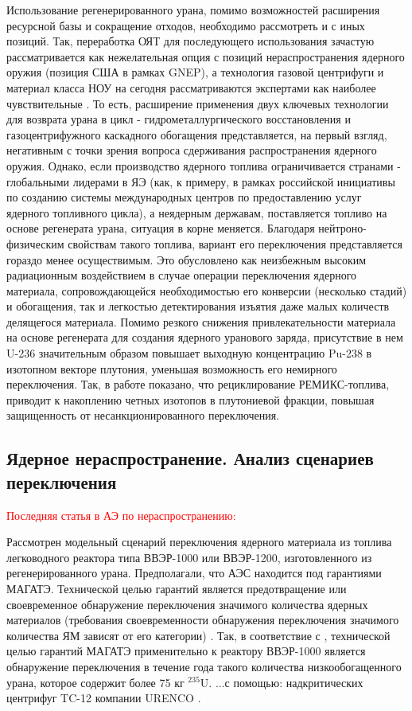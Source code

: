 Использование регенерированного урана, помимо возможностей расширения ресурсной базы и сокращение отходов, необходимо рассмотреть и с иных позиций. Так, переработка ОЯТ для последующего использования зачастую рассматривается как нежелательная опция с позиций нераспространения ядерного оружия (позиция США в рамках GNEP), а технология газовой центрифуги и материал класса НОУ на сегодня рассматриваются экспертами как наиболее чувствительные \cite{nevinicaPovyshenieZashchishchennostiEksportnyh}. То есть, расширение применения двух ключевых технологии для возврата урана в цикл - гидрометаллургического восстановления и газоцентрифужного каскадного обогащения представляется, на первый взгляд, негативным с точки зрения вопроса сдерживания распространения ядерного оружия. Однако, если производство ядерного топлива ограничивается странами - глобальными лидерами в ЯЭ (как, к примеру, в рамках российской инициативы по созданию системы международных центров по предоставлению услуг ядерного топливного цикла), а неядерным державам, поставляется топливо на основе регенерата урана, ситуация в корне меняется. Благодаря нейтроно-физическим свойствам такого топлива, вариант его переключения представляется гораздо менее осуществимым. Это обусловлено как неизбежным высоким радиационным воздействием в случае операции переключения ядерного материала, сопровождающейся необходимостью его конверсии (несколько стадий) и обогащения, так и легкостью детектирования изъятия даже малых количеств делящегося материала. Помимо резкого снижения привлекательности материала на основе регенерата для создания ядерного уранового заряда, присутствие в нем U-236 значительным образом повышает выходную концентрацию Pu-238 в изотопном векторе плутония, уменьшая возможность его немирного переключения. Так, в работе \cite{solovevAnalizYadernogoToplivnogo2019} показано, что рециклирование РЕМИКС-топлива, приводит к накоплению четных изотопов в плутониевой фракции, повышая защищенность от несанкционированного переключения.


\subsection{Ядерное нераспространение. Анализ сценариев переключения}\label{sec:ch1/sec5.1}

\textcolor{red}{Последняя статья в АЭ по нераспространению:}

Рассмотрен модельный сценарий переключения ядерного материала из топлива легководного реактора типа ВВЭР-1000 или ВВЭР-1200,  изготовленного из регенерированного урана. Предполагали, что АЭС находится под гарантиями МАГАТЭ. Технической целью гарантий является предотвращение или своевременное обнаружение переключения значимого количества ядерных материалов (требования своевременности обнаружения переключения значимого количества ЯМ зависят от  его категории) \cite{ermakovVozmozhnyeProceduryGarantiy1987}. Так, в соответствие с \cite{ermakovVozmozhnyeProceduryGarantiy1987}, технической целью гарантий МАГАТЭ применительно к реактору ВВЭР-1000 является обнаружение переключения в течение года такого количества низкообогащенного урана, которое содержит более 75 кг $^{235}$U.
...с помощью:  надкритических центрифуг TC-12 компании URENCO \cite{borisevichIdealOptimumCascades2014}. 


